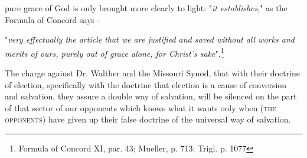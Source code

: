 pure grace of God is only brought more clearly to light: "\textit{it establishes}," as the Formula of Concord says - \begin{displayquote}"\textit{very effectually the article that we are justified and saved without all works and merits of ours, purely out of grace alone, for Christ's sake}".\footnote{Formula of Concord XI, par. 43; Mueller, p. 713; Trigl. p. 1077}\end{displayquote}

The charge against Dr. Walther and the Missouri Synod, that with their doctrine of election, specifically with the doctrine that election is a cause of conversion and salvation, they assure a double way of salvation, will be silenced on the part of that sector of our opponents which knows what it wants only when {\scriptsize\textsc{(the opponents)}} have given up their false doctrine of the universal way of salvation.
